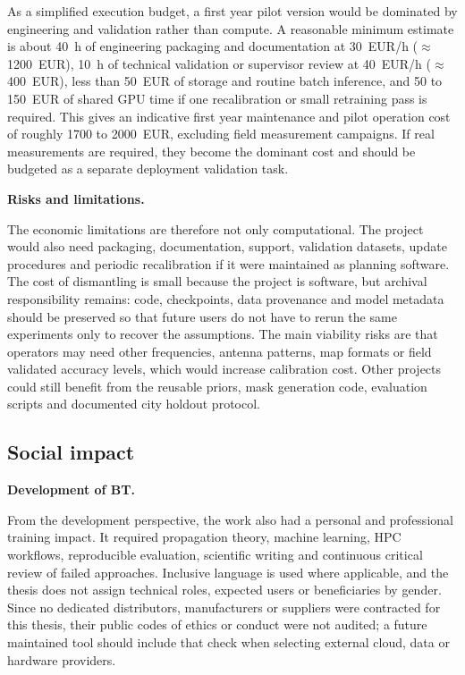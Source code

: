 As a simplified execution budget, a first year pilot version would be dominated
by engineering and validation rather than compute. A reasonable minimum estimate
is about \SI{40}{h} of engineering packaging and documentation at 30~EUR/h
(\(\approx\)1200~EUR), \SI{10}{h} of technical validation or supervisor review
at 40~EUR/h (\(\approx\)400~EUR), less than 50~EUR of storage and routine batch
inference, and 50 to 150~EUR of shared GPU time if one recalibration or small
retraining pass is required. This gives an indicative first year maintenance
and pilot operation cost of roughly 1700 to 2000~EUR, excluding field measurement
campaigns. If real measurements are required, they become the dominant cost and
should be budgeted as a separate deployment validation task.

\textbf{Risks and limitations.}

The economic limitations are therefore not only computational. The project
would also need packaging, documentation, support, validation datasets, update
procedures and periodic recalibration if it were maintained as planning
software. The cost of dismantling is small because the project is software, but
archival responsibility remains: code, checkpoints, data provenance and model
metadata should be preserved so that future users do not have to rerun the same
experiments only to recover the assumptions.
The main viability risks are that operators may need other frequencies, antenna
patterns, map formats or field validated accuracy levels, which would increase
calibration cost. Other projects could still benefit from the reusable priors,
mask generation code, evaluation scripts and documented city holdout protocol.

\subsection{Social impact}

\textbf{Development of BT.}

From the development perspective, the work also had a personal and professional
training impact. It required propagation theory, machine learning, HPC
workflows, reproducible evaluation, scientific writing and continuous critical
review of failed approaches. Inclusive language is used where applicable, and
the thesis does not assign technical roles, expected users or beneficiaries by
gender. Since no dedicated distributors, manufacturers or suppliers were
contracted for this thesis, their public codes of ethics or conduct were not
audited; a future maintained tool should include that check when selecting
external cloud, data or hardware providers.

